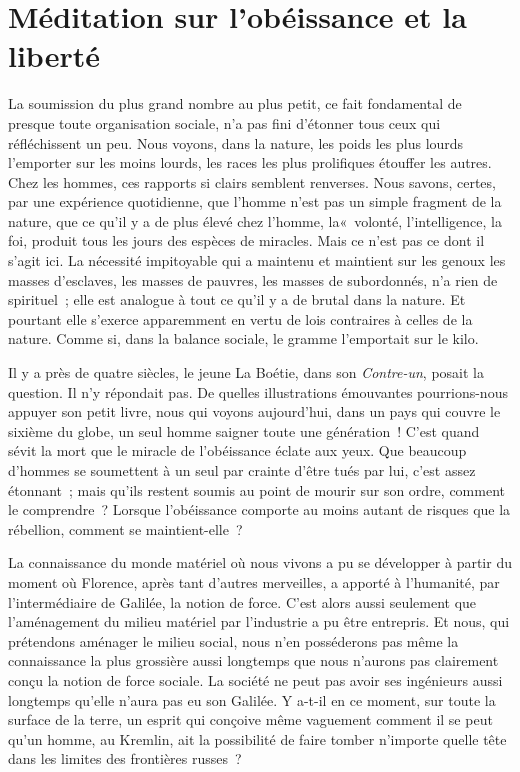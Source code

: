 \documentclass[french,twoside]{book} %
\begin{document}
\begin{center}
\noindent \centerline{}
\end{center}

\section[{Méditation sur l’obéissance et la liberté}]{Méditation sur l’obéissance et la liberté}\renewcommand{\leftmark}{Méditation sur l’obéissance et la liberté}

\noindent \par
La soumission du plus grand nombre au plus petit, ce fait fondamental de presque toute organisation sociale, n'a pas fini d'étonner tous ceux qui réfléchissent un peu. Nous voyons, dans la nature, les poids les plus lourds l'emporter sur les moins lourds, les races les plus prolifiques étouffer les autres. Chez les hommes, ces rapports si clairs semblent renverses. Nous savons, certes, par une expérience quotidienne, que l'homme n'est pas un simple fragment de la nature, que ce qu'il y a de plus élevé chez l'homme, la« volonté, l'intelligence, la foi, produit tous les jours des espèces de miracles. Mais ce n'est pas ce dont il s'agit ici. La nécessité impitoyable qui a maintenu et maintient sur les genoux les masses d'esclaves, les masses de pauvres, les masses de subordonnés, n'a rien de spirituel ; elle est analogue à tout ce qu'il y a de brutal dans la nature. Et pourtant elle s'exerce apparemment en vertu de lois contraires à celles de la nature. Comme si, dans la balance sociale, le gramme l'emportait sur le kilo.\par
Il y a près de quatre siècles, le jeune La Boétie, dans son {\itshape Contre-un}, posait la question. Il n'y répondait pas. De quelles illustrations émouvantes pourrions-nous appuyer son petit livre, nous qui voyons aujourd'hui, dans un pays qui couvre le sixième du globe, un seul homme saigner toute une génération ! C'est quand sévit la mort que le miracle de l'obéissance éclate aux yeux. Que beaucoup d'hommes se soumettent à un seul par crainte d'être tués par lui, c'est assez étonnant ; mais qu'ils restent soumis au point de mourir sur son ordre, comment le comprendre ? Lorsque l'obéissance comporte au moins autant de risques que la rébellion, comment se maintient-elle ?\par
La connaissance du monde matériel où nous vivons a pu se développer à partir du moment où Florence, après tant d'autres merveilles, a apporté à l'humanité, par l'intermédiaire de Galilée, la notion de force. C'est alors aussi seulement que l'aménagement du milieu matériel par l'industrie a pu être entrepris. Et nous, qui prétendons aménager le milieu social, nous n'en posséderons pas même la connaissance la plus grossière aussi longtemps que nous n'aurons pas clairement conçu la notion de force sociale. La société ne peut pas avoir ses ingénieurs aussi longtemps qu'elle n'aura pas eu son Galilée. Y a-t-il en ce moment, sur toute la surface de la terre, un esprit qui conçoive même vaguement comment il se peut qu'un homme, au Kremlin, ait la possibilité de faire tomber n'importe quelle tête dans les limites des frontières russes ?\par
\end{document}
